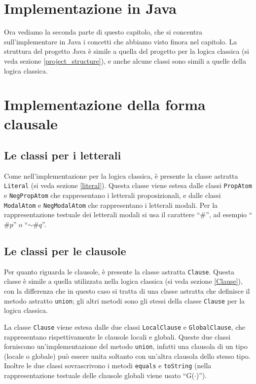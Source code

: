 \documentclass[a4paper,12pt]{report}
\begin{document}
\section*{Implementazione in Java}
Ora vediamo la seconda parte di questo capitolo, che si concentra sull'implementare in Java i concetti che abbiamo visto finora nel capitolo. La struttura del progetto Java è simile a quella del progetto per la logica classica (si veda sezione \ref{project_structure}), e anche alcune classi sono simili a quelle della logica classica.

\section{Implementazione della forma clausale}
\subsection*{Le classi per i letterali}
Come nell'implementazione per la logica classica, è presente la classe astratta \texttt{Literal} (si veda sezione \ref{literal}). Questa classe viene estesa dalle classi \texttt{PropAtom} e \texttt{NegPropAtom} che rappresentano i letterali proposizionali, e dalle classi \texttt{ModalAtom} e \texttt{NegModalAtom} che rappresentano i letterali modali. Per la rappresentazione testuale dei letterali modali si usa il carattere ``$\#$'', ad esempio ``$\#p$'' o ``$\sim\!\#q$''.

\subsection*{Le classi per le clausole}
Per quanto riguarda le clausole, è presente la classe astratta \texttt{Clause}. Questa classe è simile a quella utilizzata nella logica classica (si veda sezione \ref{Clause}), con la differenza che in questo caso si tratta di una classe astratta che definisce il metodo astratto \texttt{union}; gli altri metodi sono gli stessi della classe \texttt{Clause} per la logica classica.

La classe \texttt{Clause} viene estesa dalle due classi \texttt{LocalClause} e \texttt{GlobalClause}, che rappresentano rispettivamente le clausole locali e globali. Queste due classi forniscono un'implementazione del metodo \texttt{union}, infatti una clausola di un tipo (locale o globale) può essere unita soltanto con un'altra clausola dello stesso tipo. Inoltre le due classi sovrascrivono i metodi \texttt{equals} e \texttt{toString} (nella rappresentazione testuale delle clausole globali viene usato ``G($\cdot$)'').
\end{document}
